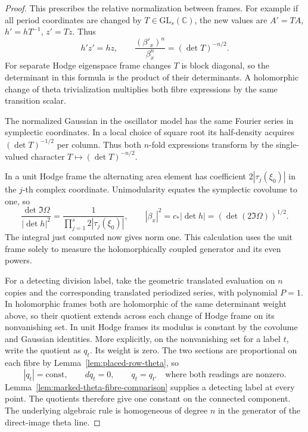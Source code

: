 \begin{proof}
This prescribes the relative normalization between frames.
For example if all period coordinates are changed by
\(T\in\mathrm{GL}_s(\mathbb C)\), the new values are
\(A'=TA\), \(h'=hT^{-1}\), \(z'=Tz\). Thus
\[
         h'z'=hz,\qquad
         \frac{(\beta'_x)^n}{\beta_x^n}=(\det T)^{-n/2}.
\]
For separate Hodge eigenspace frame changes \(T\) is block
diagonal, so the determinant in this formula is the product
of their determinants. A holomorphic change of theta
trivialization multiplies both fibre expressions by the same
transition scalar.

The normalized Gaussian in the oscillator model has the same
Fourier series in symplectic coordinates. In a local choice of
square root its half-density acquires \((\det T)^{-1/2}\) per
column. Thus both \(n\)-fold expressions transform by the
single-valued character \(T\mapsto(\det T)^{-n/2}\).

In a unit Hodge frame the alternating area element has coefficient
\(2|\tau_j(\xi_0)|\) in the \(j\)-th complex coordinate.
Unimodularity equates the symplectic covolume to one, so
\[
  \frac{\det\Im\Omega}{|\det h|^2}
     =\frac{1}{\prod_{j=1}^s2|\tau_j(\xi_0)|},\qquad
  |\beta_x|^2=c_*|\det h|=(\det(2\Im\Omega))^{1/2}.
\]
The integral just computed now gives norm one. This calculation
uses the unit frame solely to measure the holomorphically
coupled generator and its even powers.

For a detecting division label, take the geometric translated
evaluation on \(n\) copies and the corresponding translated
periodized series, with polynomial \(P=1\). In holomorphic frames
both are holomorphic of the same determinant weight above, so
their quotient extends across each change of Hodge frame on its
nonvanishing set. In unit Hodge frames its modulus is constant
by the covolume and Gaussian identities. More explicitly, on
the nonvanishing set for a label \(t\), write the quotient as
\(q_t\). Its weight is zero. The two sections are proportional
on each fibre by Lemma~\ref{lem:placed-row-theta}, so
\[
      |q_t|=\mathrm{const},\qquad dq_t=0,\qquad
      q_t=q_{t'}\quad\text{where both readings are nonzero}.
\]
Lemma~\ref{lem:marked-theta-fibre-comparison} supplies a
detecting label at every point. The quotients therefore give
one constant on the connected component. The underlying
algebraic rule is homogeneous of degree \(n\) in the generator
of the direct-image theta line.


\end{proof}
